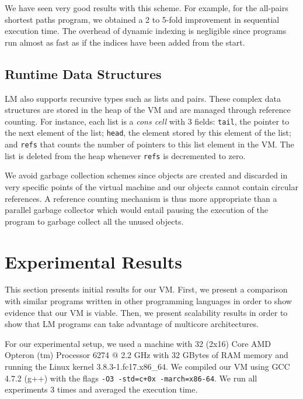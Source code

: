 \documentclass{sigplanconf}
\begin{document}
We have seen very good results with this scheme. For example, for the
all-pairs shortest paths program, we obtained a 2 to 5-fold
improvement in sequential execution time.  The overhead of dynamic
indexing is negligible since programs run almost as fast as if the
indices have been added from the start.


\subsection{Runtime Data Structures}

LM also supports recursive types such as lists and pairs. These
complex data structures are stored in the heap of the VM and are
managed through reference counting. For instance, each list is
a \emph{cons cell} with 3 fields: \texttt{tail}, the pointer to the
next element of the list; \texttt{head}, the element stored by this
element of the list; and \texttt{refs} that counts the number of
pointers to this list element in the VM. The list is deleted from the
heap whenever \texttt{refs} is decremented to zero.

We avoid garbage collection schemes since objects are created and discarded
in very specific points of the virtual machine and our objects cannot contain circular references.
A reference counting mechanism is thus more appropriate than a parallel garbage collector which
would entail pausing the execution of the program to garbage collect all the unused objects.
 
\makeatletter{}\newcommand{\plotsize}{0.45\textwidth}


\section{Experimental Results}
\label{results}

This section presents initial results for our VM. First, we present a
comparison with similar programs written in other programming
languages in order to show evidence that our VM is viable. Then, we
present scalability results in order to show that LM programs can take
advantage of multicore architectures.

For our experimental setup, we used a machine with 32 (2x16) Core AMD
Opteron (tm) Processor 6274 $@$ 2.2 GHz with 32 GBytes of RAM memory
and running the Linux kernel 3.8.3-1.fc17.x86\_64.  We compiled our VM
using GCC 4.7.2 (g++) with the flags \texttt{-O3 -std=c+0x
  -march=x86-64}. We run all experiments 3 times and averaged the
execution time.
\end{document}
